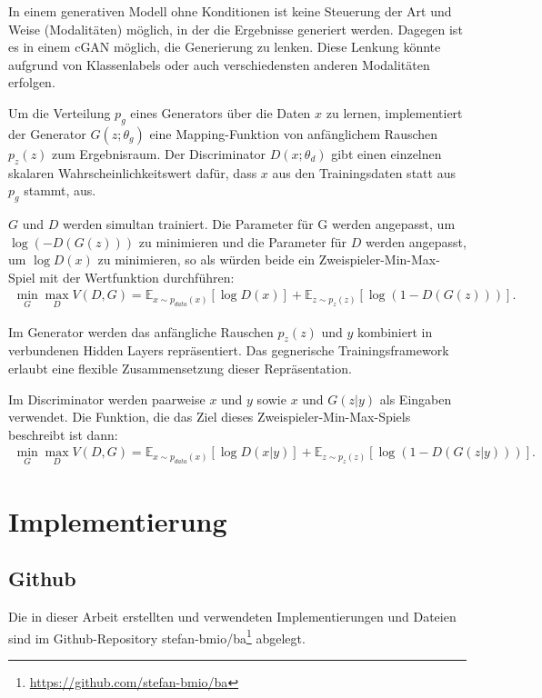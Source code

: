 In einem generativen Modell ohne Konditionen ist keine Steuerung der Art und Weise (Modalitäten) möglich, in der die Ergebnisse generiert werden. Dagegen ist es in einem cGAN möglich, die Generierung zu lenken. Diese Lenkung könnte aufgrund von Klassenlabels oder auch verschiedensten anderen Modalitäten erfolgen.

Um die Verteilung $p_g$ eines Generators über die Daten $x$ zu lernen, implementiert der Generator $G(z;\theta_g)$ eine Mapping-Funktion von anfänglichem Rauschen $p_z(z)$ zum Ergebnisraum. Der Discriminator $D(x;\theta_d)$ gibt einen einzelnen skalaren Wahrscheinlichkeitswert dafür, dass $x$ aus den Trainingsdaten statt aus $p_g$ stammt, aus.

$G$ und $D$ werden simultan trainiert. Die Parameter für G werden angepasst, um $\log(-D(G(z)))$ zu minimieren und die Parameter für $D$ werden angepasst, um $\log D(x)$ zu minimieren, so als würden beide ein Zweispieler-Min-Max-Spiel mit der Wertfunktion durchführen:
\begin{align}
\min_{G}\max_{D} V(D,G) = \mathbb{E}_{x\sim p_{data}(x)}[\log{D(x)}]+\mathbb{E}_{z\sim p_z(z)}[\log(1-D(G(z)))].
\end{align}

Im Generator werden das anfängliche Rauschen $p_z(z)$ und $y$ kombiniert in verbundenen Hidden Layers repräsentiert. Das gegnerische Trainingsframework erlaubt eine flexible Zusammensetzung dieser Repräsentation.

Im Discriminator werden paarweise $x$ und $y$ sowie $x$ und $G(z|y)$ als Eingaben verwendet. Die Funktion, die das Ziel dieses Zweispieler-Min-Max-Spiels beschreibt ist dann:
\begin{align}
\min_{G}\max_{D} V(D,G) = \mathbb{E}_{x\sim p_{data}(x)}[\log{D(x|y)}]+\mathbb{E}_{z\sim p_z(z)}[\log(1-D(G(z|y)))].
\end{align}
\cite{mirza2014conditional}

\chapter{Implementierung}
\label{ch:impl}

\section{Github}
\label{sec:github}
Die in dieser Arbeit erstellten und verwendeten Implementierungen und Dateien sind im Github-Repository stefan-bmio/ba\footnote{\href{https://github.com/stefan-bmio/ba}{https://github.com/stefan-bmio/ba}} abgelegt.

